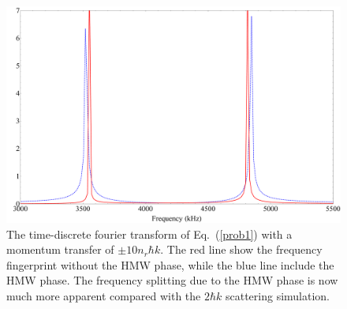 \documentclass[twocolumn,english,pra,aps,superscriptaddress,floatfix]{revtex4-1}
\begin{document}
\begin{figure}
\includegraphics[width=1\columnwidth]{FT10hk.pdf}
\caption{The time-discrete fourier transform of Eq.\ (\ref{prob1}) with a momentum transfer of $\pm10 n_r\hbar k$.  The red line show the frequency fingerprint without the HMW phase, while the blue line include the HMW phase. The frequency splitting due to the HMW phase is now much more apparent compared with the $2\hbar k$ scattering simulation.} 
\label{fig:ft10hk}
\end{figure}




 
\end{document}
